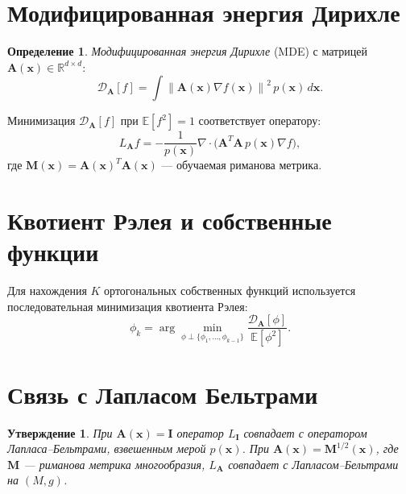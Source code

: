 \documentclass[14pt, a4paper, oneside]{extreport}
\theoremstyle{plain}
\newtheorem{proposition}[theorem]{Утверждение}
\theoremstyle{definition}
\newtheorem{definition}[theorem]{Определение}
\newcommand{\R}{\mathbb{R}}
\newcommand{\E}{\mathbb{E}}
\newcommand{\norm}[1]{\left\lVert #1 \right\rVert}
\begin{document}
\section{Модифицированная энергия Дирихле}

\begin{definition}
\emph{Модифицированная энергия Дирихле} (MDE) с матрицей $\mathbf{A}(\mathbf{x}) \in \R^{d \times d}$:
\begin{equation}
  \mathcal{D}_{\mathbf{A}}[f] = \int \norm{\mathbf{A}(\mathbf{x}) \nabla f(\mathbf{x})}^2 \, p(\mathbf{x}) \, d\mathbf{x}.
\end{equation}
\end{definition}

Минимизация $\mathcal{D}_{\mathbf{A}}[f]$ при $\E[f^2] = 1$ соответствует оператору:
\begin{equation}
  L_{\mathbf{A}} f = -\frac{1}{p(\mathbf{x})} \nabla \cdot \big(\mathbf{A}^T\mathbf{A}\, p(\mathbf{x}) \nabla f\big),
\end{equation}
где $\mathbf{M}(\mathbf{x}) = \mathbf{A}(\mathbf{x})^T \mathbf{A}(\mathbf{x})$ — обучаемая риманова метрика.

\section{Квотиент Рэлея и собственные функции}

Для нахождения $K$ ортогональных собственных функций используется последовательная минимизация квотиента Рэлея:
\begin{equation}
  \phi_k = \arg\min_{\phi \perp \{\phi_1,\ldots,\phi_{k-1}\}} \frac{\mathcal{D}_{\mathbf{A}}[\phi]}{\E[\phi^2]}.
\end{equation}


\section{Связь с Лапласом Бельтрами}

\begin{proposition}
При $\mathbf{A}(\mathbf{x}) = \mathbf{I}$ оператор $L_{\mathbf{I}}$ совпадает с оператором Лапласа--Бельтрами, взвешенным мерой $p(\mathbf{x})$.
При $\mathbf{A}(\mathbf{x}) = \mathbf{M}^{1/2}(\mathbf{x})$, где $\mathbf{M}$ — риманова метрика многообразия, $L_{\mathbf{A}}$ совпадает с Лапласом--Бельтрами на $(M, g)$.
\end{proposition}
\end{document}
